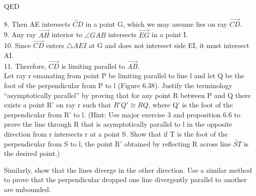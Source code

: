 \documentclass[12pt,letterpaper]{article}
\newcommand{\QED}{\begin{flushright}QED\end{flushright}}
\newcommand{\prob}[1]{\newpage\noindent {\bf #1}}
\begin{document}
\QED


8. Then AE intersects $\overleftrightarrow{CD}$ in a point G, which we may assume lies on ray $\overrightarrow{CD}$. \\



9. Any ray $\overrightarrow{AH}$ interior to $\angle GAB$ intersects $\overrightarrow{EG}$ in a point I.\\

10.  Since $\overrightarrow{CD}$ enters $\triangle AEI$ at G and does not intersect side EI, it must intersect AI.\\

11. Therefore, $\overrightarrow{CD}$ is limiting parallel to $\overrightarrow{AB}$. \\




\prob{Major Exercises 11 } Let ray r emanating from point P be limiting parallel to line l and let Q be the foot of the perpendicular from P to l (Figure 6.38).  Justify the terminology ``asymptotically parallel'' by proving that for any point R between P and Q there exists a point R' on ray r such that $R'Q' \cong RQ$, where Q' is the foot of the perpendicular from R' to l.  (Hint: Use major exercise 3 and proposition 6.6 to prove the line through R that is asymptotically parallel to l in the opposite direction from r intersects r at a point S.  Show that if T is the foot of the perpendicular from S to l, the point R' obtained by reflecting R across line $\overleftrightarrow{ST}$ is the desired point.)

	Similarly, show that the lines diverge in the other direction.  Use a similar method to prove that the perpendicular dropped one line divergently parallel to another are unbounded. 
\end{document}
